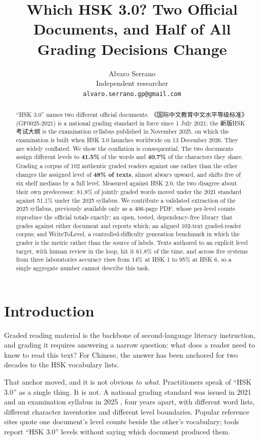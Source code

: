 \documentclass[11pt]{article}
\title{Which HSK 3.0? Two Official Documents, and Half of All\\
       Grading Decisions Change}
\author{Alvaro Serrano \\
  Independent researcher \\
  \texttt{alvaro.serrano.gp@gmail.com}}
\begin{document}
\maketitle

\begin{abstract}
``HSK 3.0'' names two different official documents.
《国际中文教育中文水平等级标准》 (GF0025-2021) is a national grading standard in
force since 1 July 2021; the 新版HSK考试大纲 is the examination syllabus
published in November 2025, on which the examination is built when HSK 3.0
launches worldwide on 13 December 2026. They are widely
conflated. We show the conflation is consequential. The two documents assign
different levels to \textbf{41.5\%} of the words and \textbf{40.7\%} of the
characters they share. Grading a corpus of 102 authentic graded readers against
one rather than the other changes the assigned level of \textbf{48\% of texts},
almost always upward, and shifts five of six shelf medians by a full level.
Measured against HSK 2.0, the two disagree about their own predecessor: 81.8\%
of jointly graded words moved under the 2021 standard against 51.1\% under the
2025 syllabus. We contribute a validated extraction of the 2025 syllabus,
previously available only as a 406-page PDF, whose per-level counts reproduce
the official totals exactly; an open, tested, dependency-free library that
grades against either document and reports which; an aligned 102-text
graded-reader corpus; and WriteToLevel, a controlled-difficulty generation
benchmark in which the grader is the metric rather than the source of labels.
Texts authored to an explicit level target, with human review in the loop, hit
it 61.8\% of the time,
and across five systems from three
laboratories accuracy rises from 14\% at HSK 1 to 95\% at HSK 6, so a single
aggregate number cannot describe this task.
\end{abstract}

\section{Introduction}

Graded reading material is the backbone of second-language literacy
instruction, and grading it requires answering a narrow question: what does a
reader need to know to read this text? For Chinese, the answer has been
anchored for two decades to the HSK vocabulary lists.

That anchor moved, and it is not obvious \emph{to what}. Practitioners speak of
``HSK 3.0'' as a single thing. It is not. A national grading standard was
issued in 2021 \citep{moe2021standard} and an examination syllabus in 2025
\citep{clec2025syllabus}, four years apart, with different word lists,
different character inventories and different level boundaries. Popular
reference sites quote one document's level counts beside the other's
vocabulary; tools report ``HSK 3.0'' levels without saying which document
produced them.
\end{document}
